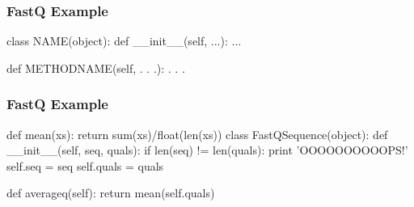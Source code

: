 \begin{frame}[fragile]
\frametitle{FastQ Example}

\begin{python}
class NAME(object):
    def __init__(self, ...):
        ...

    def METHODNAME(self, . . .):
        . . .
\end{python}

\end{frame}

\begin{frame}[fragile]
\frametitle{FastQ Example}

\begin{python}
def mean(xs):
    return sum(xs)/float(len(xs))
class FastQSequence(object):
    def __init__(self, seq, quals):
        if len(seq) != len(quals):
            print 'OOOOOOOOOOPS!'
        self.seq = seq
        self.quals = quals

    def averageq(self):
        return mean(self.quals)
\end{python}

\end{frame}



